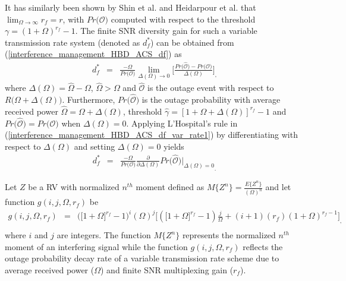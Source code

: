 It has similarly been shown by Shin et al. \cite{shin2008diversity} and Heidarpour et al. \cite{heidarpour2017finite} that $\lim_{\Omega\to\infty}r_f = r$, with $Pr\big(\mathcal{O}\big)$ computed with respect to the threshold $\gamma=(1+\Omega)^{r_f}-1$. The finite SNR diversity gain for such a variable transmission rate system (denoted as $d_{f}^{*}$) can be obtained from (\ref{interference_management_HBD_ACS_df}) as \cite[Eq. (36)]{shin2008diversity}
\begin{eqnarray}
d_f^* & = & \frac{-\Omega}{Pr\big(\mathcal{O}\big)} \lim_{\Delta(\Omega)\to0} \bigg[\frac{Pr\big(\mathcal{\widehat{O}}\big) - Pr\big(\mathcal{O}\big)}{\Delta(\Omega)}\bigg]_, \label{interference_management_HBD_ACS_df_var_rate1} 
\end{eqnarray}
where $\Delta(\Omega)=\widehat{\Omega}-\Omega$, $\widehat{\Omega}>\Omega$ and $\mathcal{\widehat{O}}$ is the outage event with respect to $R\big(\Omega+\Delta(\Omega)\big)$. Furthermore, $Pr\big(\mathcal{\widehat{O}}\big)$ is the outage probability with average received power $\widehat{\Omega}=\Omega+\Delta(\Omega)$, threshold $\widehat{\gamma}=[1+\Omega+\Delta(\Omega)]^{r_f}-1$ and $Pr\big(\mathcal{\widehat{O}}\big)=Pr\big(\mathcal{O}\big)$ when $\Delta(\Omega)=0$. Applying L'Hospital's rule in (\ref{interference_management_HBD_ACS_df_var_rate1}) by differentiating with respect to $\Delta(\Omega)$ and setting $\Delta(\Omega)=0$ yields
\begin{eqnarray} 
d_f^* & = & \frac{-\Omega}{Pr\big(\mathcal{O}\big)} \frac{\partial}{\partial\Delta(\Omega)} Pr\big(\mathcal{\widehat{O}}\big) {\Bigg|_{\Delta(\Omega)=0}}_. \label{interference_management_HBD_ACS_df_var_rate2}
\end{eqnarray}

Let $Z$ be a RV with normalized $n^{th}$ moment defined as $M\{Z^{n}\}=\frac{E\{Z^{n}\}}{(\Omega)^{n}}$ and let function $g(i,j,\Omega,r_f)$ be 
\begin{eqnarray} 
g(i,j,\Omega,r_f) & = & \big(\big[1 + \Omega\big]^{r_f}-1\big)^{i} (\Omega)^{j} \bigg[ \left(\big[1 + \Omega\big]^{r_f} - 1\right) \frac{j}{\Omega} + (i+1)(r_f)(1 + \Omega)^{r_f-1} \bigg]_, \nonumber \\
\end{eqnarray}
where $i$ and $j$ are integers. The function $M\{Z^{n}\}$ represents the normalized $n^{th}$ moment of an interfering signal while the function $g(i,j,\Omega,r_f)$ reflects the outage probability decay rate of a variable transmission rate scheme due to average received power ($\Omega$) and finite SNR multiplexing gain ($r_f$).

